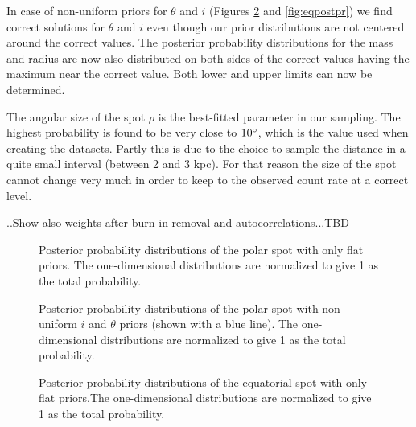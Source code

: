 \documentclass{wihuri}
\begin{document}
In case of non-uniform priors for $\theta$ and $i$ (Figures \ref{fig:polpostpr} and \ref{fig:eqpostpr}) we find correct solutions for $\theta$ and $i$ even though our prior distributions are not centered  around the correct values. The posterior probability distributions for the mass and radius are now also distributed on both sides of the correct values having the maximum near the correct value. Both lower and upper limits can now be determined. 

The angular size of the spot $\rho$ is the best-fitted parameter in our sampling. The highest probability is found to be very close to $10 \degree$, which is the value used when creating the datasets. Partly this is due to the choice to sample the distance in a quite small interval (between 2 and 3 kpc). For that reason the size of the spot cannot change very much in order to keep to the observed count rate at a correct level. 


..Show also weights after burn-in removal and autocorrelations...TBD


\begin{figure}
\centerline{}
\caption{Posterior probability distributions of the polar spot with only flat priors. The one-dimensional distributions are normalized to give 1 as the total probability.
\label{fig:polpost}}
\end{figure}

\begin{figure}
\centerline{}
\caption{Posterior probability distributions of the polar spot with non-uniform $i$ and $\theta$ priors (shown with a blue line). The one-dimensional distributions are normalized to give 1 as the total probability.
\label{fig:polpostpr}}
\end{figure}



\begin{figure}
\centerline{}
\caption{Posterior probability distributions of the equatorial spot with only flat priors.The one-dimensional distributions are normalized to give 1 as the total probability.
\label{fig:eqpost}}
\end{figure}
\end{document}
